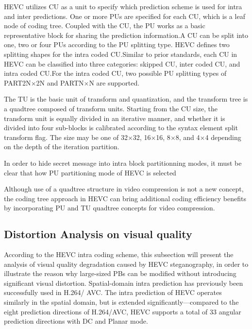 \documentclass[journal,sort]{IEEEtran}
\begin{document}
HEVC utilizes CU as a unit to specify which prediction
scheme is used for intra and inter predictions. One or more PUs are specified for each CU, which is
a leaf node of coding tree. Coupled with the CU, the PU
works as a basic representative block for sharing the prediction
information.A CU can be split into one, two or four PUs according to
the PU splitting type. HEVC defines two splitting shapes for
the intra coded CU.Similar to prior standards, each CU
in HEVC can be classified into three categories: skipped CU,
inter coded CU, and intra coded CU.For the intra coded CU, two possible
PU splitting types of PART2N$\times$2N and PARTN$\times$N
are supported.

The TU is the basic unit of transform and quantization, and the transform tree is a quadtree composed of transform units. Starting from the CU size, the transform unit is equally divided in an iterative manner, and whether it is divided into four sub-blocks is calibrated according to the syntax element split transform flag. The size may be one of 32$\times$32, 16$\times$16, 8$\times$8, and 4$\times$4 depending on the depth of the iteration partition.





In order to hide secret message into intra block partitionning modes, it must be clear that
how PU partitioning mode of HEVC is selected


Although use of a quadtree structure in video compression is not a new concept, the coding tree approach in HEVC can bring additional coding efficiency benefits by incorporating PU and TU quadtree concepts for video compression.




\subsection{Distortion Analysis on visual quality}
According to the HEVC intra coding scheme, this subsection will present the analysis of visual quality degradation caused by HEVC steganography, in order to illustrate the reason why large-sized PBs can be modified without introducing significant visual distortion.
Spatial-domain intra prediction has previously been successfully used in H.264/ AVC. The intra prediction of HEVC operates similarly in the spatial domain, but is extended significantly—compared to the eight prediction directions of H.264/AVC, HEVC supports a total of 33 angular prediction directions with DC and Planar mode.
\end{document}

